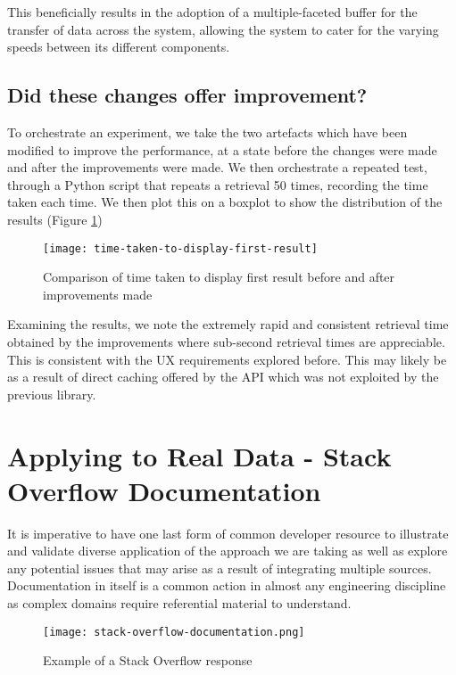 This beneficially results in the adoption of a multiple-faceted buffer for the transfer of data across the system, allowing the system to cater for the varying speeds between its different components.

\subsection{Did these changes offer improvement?}

To orchestrate an experiment, we take the two artefacts which have been modified to improve the performance, at a state before the changes were made and after the improvements were made. We then orchestrate a repeated test, through a Python script that repeats a retrieval 50 times, recording the time taken each time. We then plot this on a boxplot to show the distribution of the results (Figure \ref{fig:time-taken-to-display-first-result})

\begin{figure}[h!]
	\centering
	\texttt{[image: time-taken-to-display-first-result]}
	\caption{Comparison of time taken to display first result before and after improvements made}
	\label{fig:time-taken-to-display-first-result}
\end{figure}

Examining the results, we note the extremely rapid and consistent retrieval time obtained by the improvements where sub-second retrieval times are appreciable. This is consistent with the UX requirements explored before. This may likely be as a result of direct caching offered by the API which was not exploited by the previous library.

\section{Applying to Real Data - Stack Overflow Documentation}

It is imperative to have one last form of common developer resource to illustrate and validate diverse application of the approach we are taking as well as explore any potential issues that may arise as a result of integrating multiple sources. Documentation in itself is a common action in almost any engineering discipline as complex domains require referential material to understand.

\begin{figure}[h!]
	\centering
	\texttt{[image: stack-overflow-documentation.png]}
	\caption{Example of a Stack Overflow response}
	\label{fig:stackOverflowDocSite}
\end{figure}

